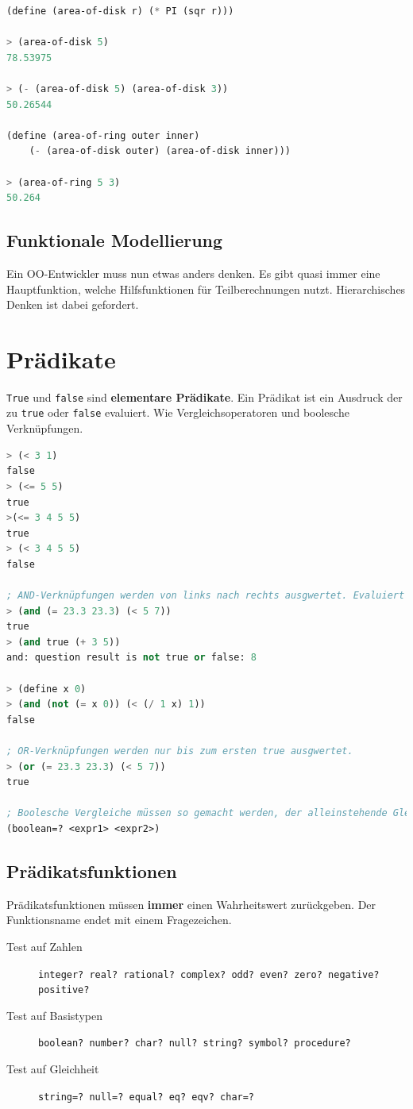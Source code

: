 \begin{lstlisting}[language=Lisp, caption=Beispiel Funktionen]
(define (area-of-disk r) (* PI (sqr r)))

> (area-of-disk 5)
78.53975

> (- (area-of-disk 5) (area-of-disk 3))
50.26544

(define (area-of-ring outer inner)
	(- (area-of-disk outer) (area-of-disk inner)))

> (area-of-ring 5 3)
50.264
\end{lstlisting}

\subsection{Funktionale Modellierung}
Ein OO-Entwickler muss nun etwas anders denken. Es gibt quasi immer eine Hauptfunktion, welche Hilfsfunktionen für Teilberechnungen nutzt. Hierarchisches Denken ist dabei gefordert.

\section{Prädikate}
\verb|True| und \verb|false| sind \textbf{elementare Prädikate}. Ein Prädikat ist ein Ausdruck der zu \verb|true| oder \verb|false| evaluiert. Wie Vergleichsoperatoren und boolesche Verknüpfungen.
\begin{lstlisting}[language=Lisp, caption=Prädikate]
> (< 3 1)
false
> (<= 5 5)
true
>(<= 3 4 5 5)
true
> (< 3 4 5 5)
false

; AND-Verknüpfungen werden von links nach rechts ausgwertet. Evaluiert ein Ausdruck links zu false, dann wird die Auswertung beendet. Falls ein Ausdruck keinen booleschen Wert zurückgibt, kommt es zum Laufzeitfehler.
> (and (= 23.3 23.3) (< 5 7))
true
> (and true (+ 3 5))
and: question result is not true or false: 8

> (define x 0)
> (and (not (= x 0)) (< (/ 1 x) 1))
false

; OR-Verknüpfungen werden nur bis zum ersten true ausgwertet.
> (or (= 23.3 23.3) (< 5 7))
true

; Boolesche Vergleiche müssen so gemacht werden, der alleinstehende Gleich-Operator ist nur für Zahlen!
(boolean=? <expr1> <expr2>)
\end{lstlisting}

\subsection{Prädikatsfunktionen}
Prädikatsfunktionen müssen \textbf{immer} einen Wahrheitswert zurückgeben. Der Funktionsname endet mit einem Fragezeichen.
\begin{description}
	\item[Test auf Zahlen] \verb|integer? real? rational? complex? odd? even? zero? negative? positive?|
	\item[Test auf Basistypen] \verb|boolean? number? char? null? string? symbol? procedure?|
	\item[Test auf Gleichheit] \verb|string=? null=? equal? eq? eqv? char=?|
\end{description}

